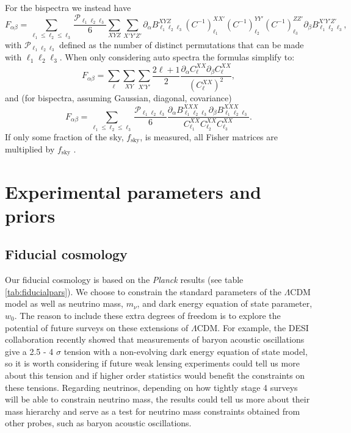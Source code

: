\documentclass[11pt]{article} %
\begin{document}
For the bispectra we instead have 
\begin{equation*}
    F_{\alpha\beta} = \sum_{\ell_1 \leq \ell_2 \leq \ell_3} \frac{\mathcal P _{\ell_1\ell_2\ell_3}}{6}
    \sum_{XYZ}\sum_{X'Y'Z'} 
    \partial_\alpha B^{X Y Z}_{\ell_1 \ell_2 \ell_3} 
    (C^{-1})^{X X'}_{\ell_1}
    (C^{-1})^{Y Y'}_{\ell_2}
    (C^{-1})^{Z Z'}_{\ell_3}
    \partial_\beta B^{X' Y' Z'}_{\ell_1 \ell_2 \ell_3},
\end{equation*}
with $\mathcal P_{\ell_1\ell_2\ell_3}$ defined as the number of distinct permutations that can be made with $\ell_1\ell_2\ell_3$. When only considering auto spectra the formulas simplify to:
\begin{equation*}
    F_{\alpha\beta} = \sum_{\ell} \sum_{XY}\sum_{X'Y'}\frac{2\ell+1}{2}\frac{\partial_{\alpha}C_\ell^{XX} \partial_\beta C^{XX}_\ell}{(C_\ell^{XX})^2},
\end{equation*}
and (for bispectra, assuming Gaussian, diagonal, covariance)
\begin{equation*}
    F_{\alpha\beta} = \sum_{\ell_1 \leq \ell_2 \leq \ell_3} \frac{\mathcal P _{\ell_1\ell_2\ell_3}}{6}
    \frac{\partial_\alpha B^{X X X}_{\ell_1 \ell_2 \ell_3} 
    \partial_\beta B^{XXX}_{\ell_1 \ell_2 \ell_3}}{C^{XX}_{\ell_1}C^{XX}_{\ell_2}C^{XX}_{\ell_3}}.
\end{equation*}
If only some fraction of the sky, $f_{\text{sky}}$, is measured, all Fisher matrices are multiplied by $f_{\text{sky}}$ \cite{Takada2003}.


\section{Experimental parameters and priors}\label{sec:calcdetails}
\subsection{Fiducial cosmology}
Our fiducial cosmology is based on the \textit{Planck} results \cite{planckresults} (see table \ref{tab:fiducialpars}). We choose to constrain the standard parameters of the $\Lambda$CDM model as well as neutrino mass, $m_\nu$, and dark energy equation of state parameter, $w_0$. The reason to include these extra degrees of freedom is to explore the potential of future surveys on these extensions of $\Lambda$CDM. For example, the DESI collaboration \cite{Roy2024DESI} recently showed that measurements of baryon acoustic oscillations give a 2.5 - 4 $\sigma$ tension with a non-evolving dark energy equation of state model, so it is worth considering if future weak lensing experiments could tell us more about this tension and if higher order statistics would benefit the constraints on these tensions. Regarding neutrinos, depending on how tightly stage 4 surveys will be able to constrain neutrino mass, the results could tell us more about their mass hierarchy and serve as a test for neutrino mass constraints obtained from other probes, such as baryon acoustic oscillations. 
\end{document}
